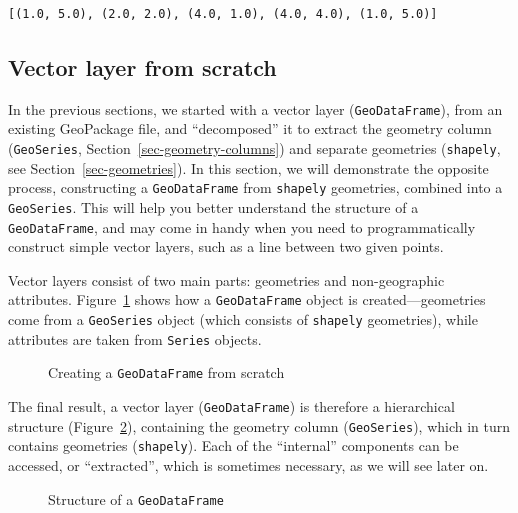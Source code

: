 \documentclass[
  letterpaper,
]{krantz}
\begin{document}
\begin{verbatim}
[(1.0, 5.0), (2.0, 2.0), (4.0, 1.0), (4.0, 4.0), (1.0, 5.0)]
\end{verbatim}

\subsection{Vector layer from
scratch}\label{sec-vector-layer-from-scratch}

In the previous sections, we started with a vector layer
(\texttt{GeoDataFrame}), from an existing GeoPackage file, and
``decomposed'' it to extract the geometry column (\texttt{GeoSeries},
Section~\ref{sec-geometry-columns}) and separate geometries
(\texttt{shapely}, see Section~\ref{sec-geometries}). In this section,
we will demonstrate the opposite process, constructing a
\texttt{GeoDataFrame} from \texttt{shapely} geometries, combined into a
\texttt{GeoSeries}. This will help you better understand the structure
of a \texttt{GeoDataFrame}, and may come in handy when you need to
programmatically construct simple vector layers, such as a line between
two given points.

Vector layers consist of two main parts: geometries and non-geographic
attributes. Figure~\ref{fig-gdf-flow} shows how a \texttt{GeoDataFrame}
object is created---geometries come from a \texttt{GeoSeries} object
(which consists of \texttt{shapely} geometries), while attributes are
taken from \texttt{Series} objects.

\begin{figure}


\caption{\label{fig-gdf-flow}Creating a \texttt{GeoDataFrame} from
scratch}

\end{figure}%

The final result, a vector layer (\texttt{GeoDataFrame}) is therefore a
hierarchical structure (Figure~\ref{fig-gdf-structure}), containing the
geometry column (\texttt{GeoSeries}), which in turn contains geometries
(\texttt{shapely}). Each of the ``internal'' components can be accessed,
or ``extracted'', which is sometimes necessary, as we will see later on.

\begin{figure}


\caption{\label{fig-gdf-structure}Structure of a \texttt{GeoDataFrame}}

\end{figure}%
\end{document}
